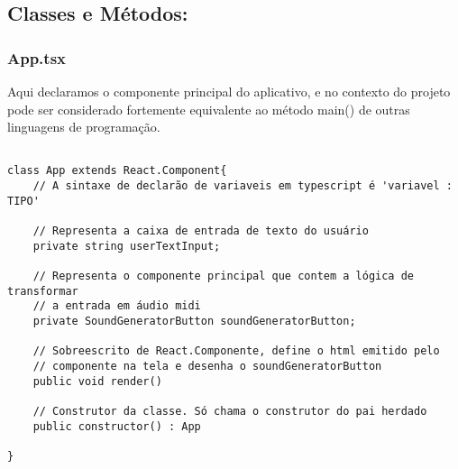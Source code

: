 \documentclass[12pt]{article}
\begin{document}
\subsection{Classes e Métodos:}
\subsubsection{App.tsx}

Aqui declaramos o componente principal do aplicativo, e no contexto do projeto pode ser considerado fortemente equivalente ao método main() de outras linguagens de programação. 


\begin{verbatim}

class App extends React.Component{
    // A sintaxe de declarão de variaveis em typescript é 'variavel : TIPO'

    // Representa a caixa de entrada de texto do usuário
    private string userTextInput;
    
    // Representa o componente principal que contem a lógica de transformar
    // a entrada em áudio midi
    private SoundGeneratorButton soundGeneratorButton;
    
    // Sobreescrito de React.Componente, define o html emitido pelo
    // componente na tela e desenha o soundGeneratorButton
    public void render()
    
    // Construtor da classe. Só chama o construtor do pai herdado
    public constructor() : App

}

\end{verbatim}
\end{document}

